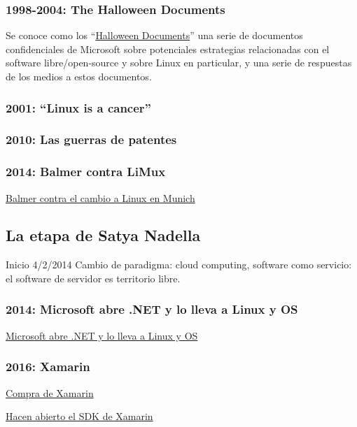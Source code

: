 \documentclass[10pt, titlepage]{article}
\begin{document}
\subsubsection{1998-2004: The Halloween Documents}
Se conoce como los ``\href{https://en.wikipedia.org/wiki/Halloween_documents}{Halloween Documents}'' una serie de documentos confidenciales de Microsoft sobre potenciales estrategias relacionadas con el software libre/open-source y sobre Linux en particular, y una serie de respuestas de los medios a estos documentos.

\subsubsection{2001: ``Linux is a cancer''}

\subsubsection{2010: Las guerras de patentes}

\subsubsection{2014: Balmer contra LiMux}
 \href{https://www.muycomputer.com/2014/05/16/linux-en-munich/}{Balmer contra el cambio a Linux en Munich}

\subsection{La etapa de Satya Nadella}
Inicio 4/2/2014
Cambio de paradigma: cloud computing, software como servicio: el software de servidor es territorio libre.

\subsubsection{2014: Microsoft abre .NET y lo lleva a Linux y OS}
\href{https://arstechnica.com/information-technology/2014/11/microsoft-open-sources-net-takes-it-to-linux-and-os-x/}{Microsoft abre .NET y lo lleva a Linux y OS}

\subsubsection{2016: Xamarin}
\href{https://www.genbeta.com/desarrollo/microsoft-adquiere-xamarin}{Compra de Xamarin}

\href{https://www.petri.com/microsofts-newly-acquired-xamarin-expands-developer-tools-new-features}{Hacen abierto el SDK de Xamarin}
\end{document}
